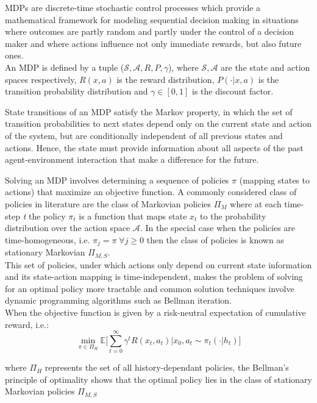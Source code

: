 MDPs  are discrete-time stochastic control processes which provide a
mathematical framework for modeling sequential decision making in situations where outcomes are
partly random and partly under the control of a decision maker and where actions influence not only immediate rewards,
but also future ones.\\
An MDP is defined by a tuple ($\mathcal{S,A},R,P,\gamma$), where $\mathcal{S,A}$ are the
state and action spaces respectively, $R(x,a)$ is the reward distribution, $P(\cdot |x,a)$ is
the transition probability distribution and $\gamma \in [0,1]$ is the discount factor. 

State transitions of an MDP satisfy the Markov property, in which
the set of transition probabilities to next states depend only on the current state and action of the system,
but are conditionally independent of all previous states and actions. Hence, the state must
provide information about all aspects of the past agent-environment interaction that
make a difference for the future.

Solving an MDP involves determining a sequence of policies $\pi$ (mapping states to actions)
that maximize an objective function.
A commonly considered class of policies in literature are the class of Markovian policies $\Pi_M$ where
at each time-step \textit{t} the policy $\pi_t$ is a function that maps state $x_t$ to 
the probability distribution over the action space $\mathcal{A}$. 
In the special case when the policies are time-homogeneous, i.e. $\pi_j = \pi \; \forall j \geq 0$ then the
class of policies is known as stationary Markovian $\Pi_{M,S}$.\\
This set of policies, under which actions only depend on current state information and
its state-action mapping is time-independent, makes the problem of solving for an optimal policy more
tractable and common solution techniques involve dynamic programming algorithms \citep{Bertsekas1995}
such as Bellman iteration.\\
When the objective function is given by a risk-neutral expectation of cumulative reward,
i.e.:
\begin{equation}
    \underset{\pi \in \Pi_H}{\min} \mathbb E  \big [  \sum_{t=0}^{\infty} \gamma^t R(x_t,a_t) | x_0, a_t \sim \pi_t(\cdot |h_t)  \big]
\end{equation} 

where $ \Pi_H$ represents the set of all history-dependant policies,
the Bellman's principle of optimality \citep{Bertsekas1995} shows that the optimal
policy lies in the class of stationary Markovian policies $\Pi_{M,S}$

